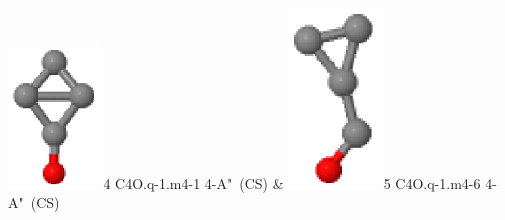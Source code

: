 \documentclass[10pt]{article}
\begin{document}
\begin{tabular}
\includegraphics[width=2.40000000000000000000cm]{C4O.q-1.m4-1.eps} \tiny{4 \hspace{1.20000000000000000000cm} C4O.q-1.m4-1 \hspace{5pt} 4-A"~(CS)} &
\includegraphics[width=2.40000000000000000000cm]{C4O.q-1.m4-6.eps} \tiny{5 \hspace{1.20000000000000000000cm} C4O.q-1.m4-6 \hspace{5pt} 4-A"~(CS)} 
\\
\end{tabular}
\end{document}
